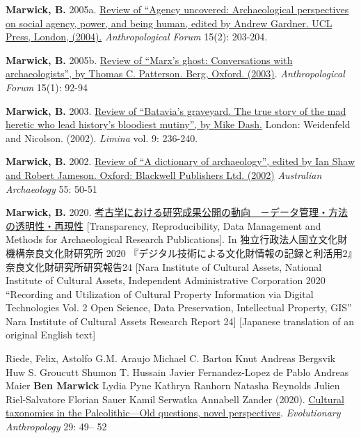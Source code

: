 \documentclass[11pt,article,oneside]{memoir}
\begin{document}
{{{\ind \textbf{Marwick, B.} 2005a. \href{http://faculty.washington.edu/bmarwick/PDFs/Uncovered.pdf}{Review of “Agency uncovered: Archaeological perspectives on social agency, power, and being human, edited by Andrew Gardner. UCL Press, London, (2004).} \textit{Anthropological Forum} 15(2): 203-204.

\ind \textbf{Marwick, B.} 2005b. \href{http://faculty.washington.edu/bmarwick/PDFs/Ghosts.pdf}{Review of “Marx’s ghost: Conversations with archaeologists”, by Thomas C. Patterson. Berg, Oxford. (2003)}. \textit{Anthropological Forum} 15(1): 92-94

\ind \textbf{Marwick, B.} 2003. \href{http://faculty.washington.edu/bmarwick/PDFs/Batavia.pdf}{Review of “Batavia’s graveyard. The true story of the mad heretic who lead history’s bloodiest mutiny”, by Mike Dash.} London: Weidenfeld and Nicolson. (2002). \textit{Limina} vol. 9: 236-240.

\ind \textbf{Marwick, B.} 2002. \href{http://faculty.washington.edu/bmarwick/PDFs/Marwick_2002_Dictionary.pdf}{Review of “A dictionary of archaeology”, edited by Ian Shaw and Robert Jameson. Oxford: Blackwell Publishers Ltd. (2002)} \textit{Australian Archaeology} 55: 50-51

\bigskip

\newpage


\ind \textbf{Marwick, B.} 2020. \href{http://doi.org/10.24484/sitereports.69974}{考古学における研究成果公開の動向　－データ管理・方法の透明性・再現性} [Transparency, Reproducibility, Data Management and Methods for Archaeological Research Publications]. In 独立行政法人国立文化財機構奈良文化財研究所 2020 『デジタル技術による文化財情報の記録と利活用2』奈良文化財研究所研究報告24 [Nara Institute of Cultural Assets, National Institute of Cultural Assets, Independent Administrative Corporation 2020 “Recording and Utilization of Cultural Property Information via Digital Technologies Vol. 2 Open Science, Data Preservation, Intellectual Property, GIS” Nara Institute of Cultural Assets Research Report 24] [Japanese translation of an original English text]

\ind Riede, Felix, Astolfo G.M. Araujo Michael C. Barton Knut Andreas Bergsvik Huw S. Groucutt Shumon T. Hussain Javier Fernandez‐Lopez de Pablo Andreas Maier \textbf{Ben Marwick} Lydia Pyne Kathryn Ranhorn Natasha Reynolds Julien Riel‐Salvatore Florian Sauer Kamil Serwatka Annabell Zander (2020). \href{https://doi.org/10.1002/evan.21819}{Cultural taxonomies in the Paleolithic—Old questions, novel perspectives}. \textit{Evolutionary Anthropology} 29: 49– 52 

}}}
\end{document}
